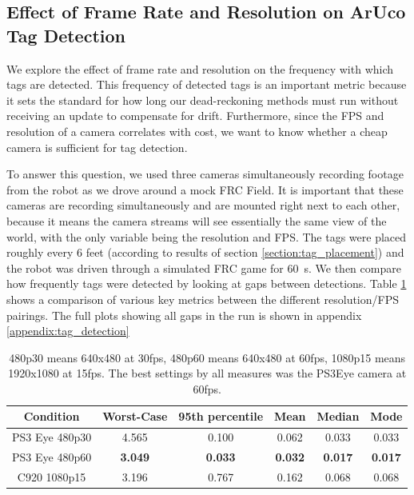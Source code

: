 \documentclass{article}
\begin{document}
	\subsection{Effect of Frame Rate and Resolution on ArUco Tag Detection}

    We explore the effect of frame rate and resolution on the frequency with which tags are detected. This frequency of detected tags is an important metric because it sets the standard for how long our dead-reckoning methods must run without receiving an update to compensate for drift. Furthermore, since the FPS and resolution of a camera correlates with cost, we want to know whether a cheap camera is sufficient for tag detection.

    To answer this question, we used three cameras simultaneously recording footage from the robot as we drove around a mock FRC Field. It is important that these cameras are recording simultaneously and are mounted right next to each other, because it means the camera streams will see essentially the same view of the world, with the only variable being the resolution and FPS. The tags were placed roughly every 6 feet (according to results of section \ref{section:tag_placement}) and the robot was driven through a simulated FRC game for \SI{60}{\second}. We then compare how frequently tags were detected by looking at gaps between detections. Table \ref{table:tag_detection_comparison} shows a comparison of various key metrics between the different resolution/FPS pairings. The full plots showing all gaps in the run is shown in appendix \ref{appendix:tag_detection}

    \begin{table}[H]
      \centering
      \begin{tabular}{|c|c|c|c|c|c|} \hline
        Condition & Worst-Case & 95th percentile & Mean & Median & Mode \\ \hline
        PS3 Eye 480p30 & 4.565 & 0.100 & 0.062 & 0.033 & 0.033 \\ \hline
        PS3 Eye 480p60 & \textbf{3.049} & \textbf{0.033} & \textbf{0.032} & \textbf{0.017} & \textbf{0.017} \\ \hline
        C920 1080p15 & 3.196 & 0.767 & 0.162 & 0.068 & 0.068 \\ \hline
      \end{tabular}
      \caption{480p30 means 640x480 at 30fps, 480p60 means 640x480 at 60fps, 1080p15 means 1920x1080 at 15fps. The best settings by all measures was the PS3Eye camera at 60fps.}
      \label{table:tag_detection_comparison}
    \end{table}
\end{document}
